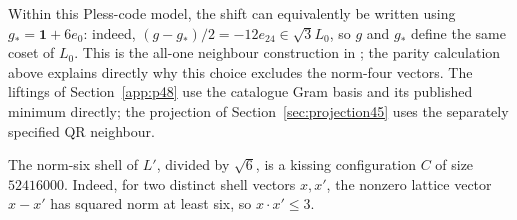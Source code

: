 Within this Pless-code model, the shift can equivalently be written
using $g_*=\boldsymbol1+6e_0$: indeed,
$(g-g_*)/2=-12e_{24}\in\sqrt3L_0$, so $g$ and $g_*$ define the
same coset of $L_0$. This is the all-one neighbour construction in
\cite{munemasa-tamura}; the parity calculation above explains directly
why this choice excludes the norm-four vectors. The liftings of
Section~\ref{app:p48} use the catalogue Gram basis and its published
minimum directly; the projection of Section~\ref{sec:projection45}
uses the separately specified QR neighbour.

The norm-six shell of $L'$, divided by $\sqrt6$,
is a kissing configuration $C$ of size $52416000$. Indeed, for two
distinct shell vectors $x,x'$, the nonzero lattice vector $x-x'$
has squared norm at least six, so $x\cdot x'\le3$.
